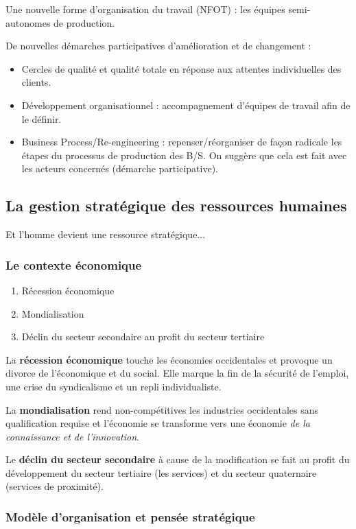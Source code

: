 \documentclass[12pt]{article}
\begin{document}
	Une nouvelle forme d’organisation du travail (NFOT) : les équipes semi-autonomes de production.
	
	De nouvelles démarches participatives d’amélioration et de changement :
	
	\begin{itemize}
		\item Cercles de qualité et qualité totale en réponse aux attentes individuelles des clients.
		\item Développement organisationnel : accompagnement d’équipes de travail afin de le définir.
		\item \og{}Business Process/Re-engineering\fg{} : repenser/réorganiser de façon radicale les étapes du processus de production des B/S. On suggère que cela est fait avec les acteurs concernés (démarche participative).
	\end{itemize}
	
	\subsection{La gestion stratégique des ressources humaines}
	Et l’homme devient une ressource stratégique...
		\subsubsection{Le contexte économique}
		\begin{enumerate}
		 \item Récession économique
		 \item Mondialisation
		 \item Déclin du secteur secondaire au profit du secteur tertiaire
		\end{enumerate}
		
		La \textbf{récession économique} touche les économies occidentales et provoque un divorce de l'économique et du social. Elle marque la fin de la sécurité de l'emploi, une crise du syndicalisme et un repli individualiste.
		
		La \textbf{mondialisation} rend non-compétitives les industries occidentales sans qualification requise et l'économie se transforme vers une économie \emph{de la connaissance et de l'innovation}.
		
		Le \textbf{déclin du secteur secondaire} à cause de la modification se fait au profit du développement du secteur tertiaire (les services) et du secteur quaternaire (services de proximité).
		
		\subsubsection{Modèle d’organisation et pensée stratégique}
		
\end{document}
